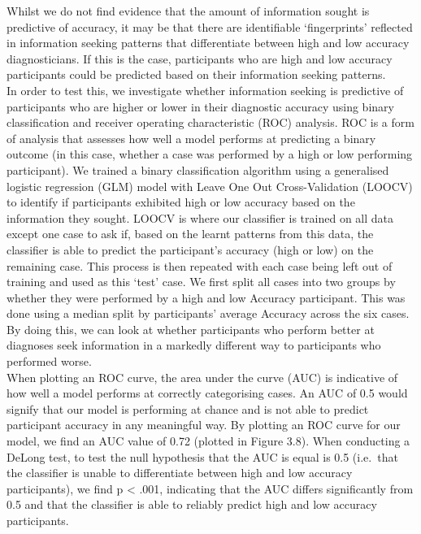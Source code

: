 \documentclass[a4paper, nobind]{templates/ociamthesis}
\begin{document}
Whilst we do not find evidence that the amount of information sought is predictive of accuracy, it may be that there are identifiable `fingerprints' reflected in information seeking patterns that differentiate between high and low accuracy diagnosticians. If this is the case, participants who are high and low accuracy participants could be predicted based on their information seeking patterns.\\

In order to test this, we investigate whether information seeking is predictive of participants who are higher or lower in their diagnostic accuracy using binary classification and receiver operating characteristic (ROC) analysis. ROC is a form of analysis that assesses how well a model performs at predicting a binary outcome (in this case, whether a case was performed by a high or low performing participant). We trained a binary classification algorithm using a generalised logistic regression (GLM) model with Leave One Out Cross-Validation (LOOCV) to identify if participants exhibited high or low accuracy based on the information they sought. LOOCV is where our classifier is trained on all data except one case to ask if, based on the learnt patterns from this data, the classifier is able to predict the participant's accuracy (high or low) on the remaining case. This process is then repeated with each case being left out of training and used as this `test' case. We first split all cases into two groups by whether they were performed by a high and low Accuracy participant. This was done using a median split by participants' average Accuracy across the six cases. By doing this, we can look at whether participants who perform better at diagnoses seek information in a markedly different way to participants who performed worse.\\

When plotting an ROC curve, the area under the curve (AUC) is indicative of how well a model performs at correctly categorising cases. An AUC of 0.5 would signify that our model is performing at chance and is not able to predict participant accuracy in any meaningful way. By plotting an ROC curve for our model, we find an AUC value of 0.72 (plotted in Figure 3.8). When conducting a DeLong test, to test the null hypothesis that the AUC is equal is 0.5 (i.e.~that the classifier is unable to differentiate between high and low accuracy participants), we find p \textless{} .001, indicating that the AUC differs significantly from 0.5 and that the classifier is able to reliably predict high and low accuracy participants.\\
\end{document}
